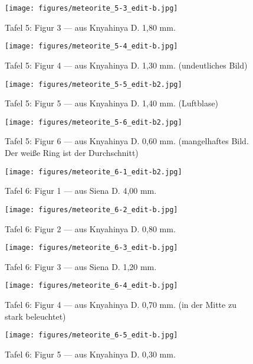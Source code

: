 \documentclass[a4paper, 12pt, oneside]{article}
\begin{document}
\begin{figure}[t]
\texttt{[image: figures/meteorite\_5-3\_edit-b.jpg]}
\caption{Tafel 5: Figur 3 --- aus Knyahinya D. 1,80 mm.}
\centering
\end{figure}
\clearpage
\begin{figure}[t]
\texttt{[image: figures/meteorite\_5-4\_edit-b.jpg]}
\caption{Tafel 5: Figur 4 --- aus Knyahinya D. 1,30 mm. (undeutliches Bild)}
\centering
\end{figure}
\clearpage
\begin{figure}[t]
\texttt{[image: figures/meteorite\_5-5\_edit-b2.jpg]}
\caption{Tafel 5: Figur 5 --- aus Knyahinya D. 1,40 mm. (Luftblase)}
\centering
\end{figure}
\clearpage
\begin{figure}[t]
\texttt{[image: figures/meteorite\_5-6\_edit-b2.jpg]}
\caption{Tafel 5: Figur 6 --- aus Knyahinya D. 0,60 mm. (mangelhaftes Bild. Der weiße Ring ist der Durchschnitt)}
\centering
\end{figure}
\clearpage
{}
\begin{figure}[t]
\texttt{[image: figures/meteorite\_6-1\_edit-b2.jpg]}
\caption{Tafel 6: Figur 1 --- aus Siena D. 4,00 mm.}
\centering
\end{figure}
\clearpage
\begin{figure}[t]
\texttt{[image: figures/meteorite\_6-2\_edit-b.jpg]}
\caption{Tafel 6: Figur 2 --- aus Knyahinya D. 0,80 mm.}
\centering
\end{figure}
\clearpage
\begin{figure}[t]
\texttt{[image: figures/meteorite\_6-3\_edit-b.jpg]}
\caption{Tafel 6: Figur 3 --- aus Siena D. 1,20 mm.}
\centering
\end{figure}
\clearpage
\begin{figure}[t]
\texttt{[image: figures/meteorite\_6-4\_edit-b.jpg]}
\caption{Tafel 6: Figur 4 --- aus Knyahinya D. 0,70 mm. (in der Mitte zu stark beleuchtet)}
\centering
\end{figure}
\clearpage
\begin{figure}[t]
\texttt{[image: figures/meteorite\_6-5\_edit-b.jpg]}
\caption{Tafel 6: Figur 5 --- aus Knyahinya D. 0,30 mm.}
\centering
\end{figure}
\end{document}
